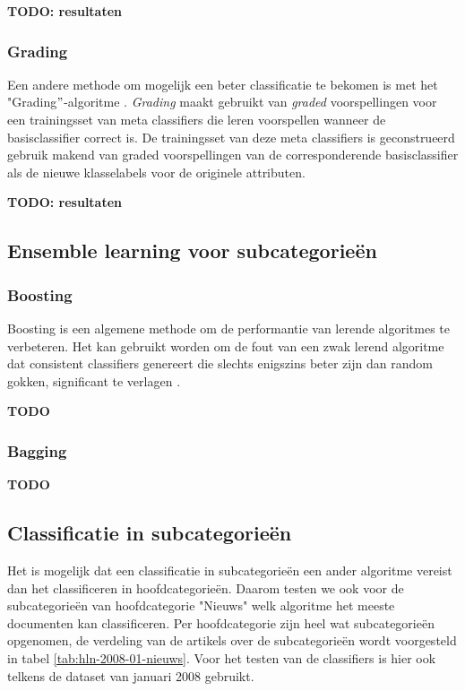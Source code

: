 \textbf{TODO: resultaten}

\subsubsection{Grading}\label{grading}
Een andere methode om mogelijk een beter classificatie te bekomen is met het "Grading$"$-algoritme \cite{SEEWALD}. \textit{Grading} maakt gebruikt van \textit{graded} voorspellingen voor een trainingsset van meta classifiers die leren voorspellen wanneer de basisclassifier correct is. De trainingsset van deze meta classifiers is geconstrueerd gebruik makend van graded voorspellingen van de corresponderende basisclassifier als de nieuwe klasselabels voor de originele attributen. 

\textbf{TODO: resultaten}
\subsection{Ensemble learning voor subcategorie\"en}
\subsubsection{Boosting}
Boosting is een algemene methode om de performantie van lerende algoritmes te verbeteren. Het kan gebruikt worden om de fout van een zwak lerend algoritme dat consistent classifiers genereert die slechts enigszins beter zijn dan random gokken, significant te verlagen \cite{Freund1996}.


\textbf{TODO}

\subsubsection{Bagging}
\textbf{TODO}
 

\subsection{Classificatie in subcategorie\"en}
Het is mogelijk dat een classificatie in subcategorie\"en een ander algoritme vereist dan het classificeren in hoofdcategorie\"en. Daarom testen we ook voor de subcategorie\"en van hoofdcategorie "Nieuws" welk algoritme het meeste documenten kan classificeren. Per hoofdcategorie zijn heel wat subcategorie\"en opgenomen, de verdeling van de artikels over de subcategorie\"en wordt voorgesteld in tabel \ref{tab:hln-2008-01-nieuws}. Voor het testen van de classifiers is hier ook telkens de dataset van januari 2008 gebruikt. 

